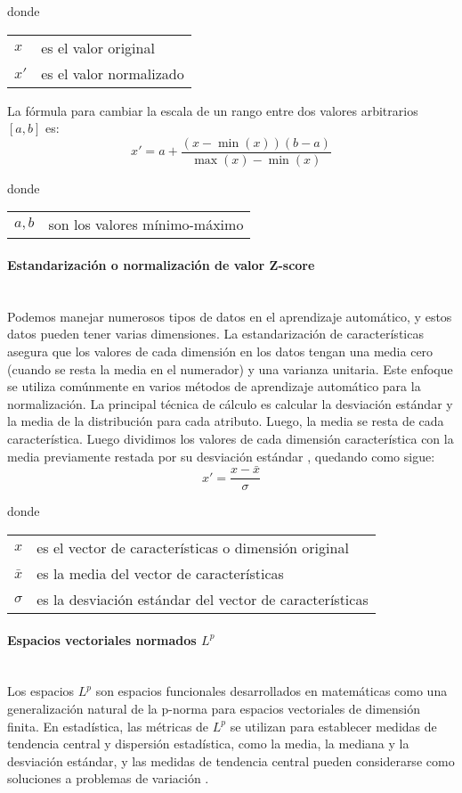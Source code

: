 \documentclass[12pt]{article}
\makeatletter
\newcommand{\subsubsubsection}[1]{\paragraph{#1}\mbox{}\\}
\newenvironment{conditions}
{\par\vspace{\abovedisplayskip}\noindent\begin{tabular}{>{$}l<{$} @{${}={}$} l}}
	{\end{tabular}\par\vspace{\belowdisplayskip}}
\makeatother
\begin{document}
			donde
			\begin{conditions}
			x   &  es el valor original \\   
			x'  &  es el valor normalizado
			\end{conditions}
			
			La fórmula para cambiar la escala de un rango entre dos valores arbitrarios $[a, b]$ es:	
			\begin{equation}\label{eq:Min_Max_scaler_entre_a_y_b}
			x'= a + \frac{(x - \min(x))(b-a)}{\max(x)-\min(x)}
			\end{equation}
						
			donde
			\begin{conditions}
			a,b   &  son los valores mínimo-máximo
			\end{conditions}
			

			\subsubsubsection{Estandarización o normalización de valor Z-score}
			Podemos manejar numerosos tipos de datos en el aprendizaje automático, y estos datos pueden tener varias dimensiones. La estandarización de características asegura que los valores de cada dimensión en los datos tengan una media cero (cuando se resta la media en el numerador) y una varianza unitaria. Este enfoque se utiliza comúnmente en varios métodos de aprendizaje automático para la normalización. La principal técnica de cálculo es calcular la desviación estándar y la media de la distribución para cada atributo. Luego, la media se resta de cada característica. Luego dividimos los valores de cada dimensión característica con la media previamente restada por su desviación estándar \cite{Fouad2020}, quedando como sigue:
			\begin{equation}\label{eq:Normalizacion_de_valor_Z-score}
			x' = \frac{x - \bar{x}}{\sigma}
			\end{equation}
			
			donde
			\begin{conditions}
			x        &  es el vector de características o dimensión original \\   
			\bar{x}  &  es la media del vector de características \\
			\sigma   & es la desviación estándar del vector de características
			\end{conditions}
						
			\subsubsubsection{Espacios vectoriales normados $L^p$}
			Los espacios $L^p$ son espacios funcionales desarrollados en matemáticas como una generalización natural de la p-norma para espacios vectoriales de dimensión finita. En estadística, las métricas de $L^p$ se utilizan para establecer medidas de tendencia central y dispersión estadística, como la media, la mediana y la desviación estándar, y las medidas de tendencia central pueden considerarse como soluciones a problemas de variación \cite{Dhinu2021}.
			
\end{document}
